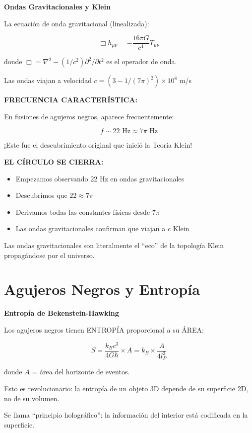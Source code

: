 \begin{nivelmatematico}
\textbf{Ondas Gravitacionales y Klein}

La ecuación de onda gravitacional (linealizada):

\begin{equation}
\Box h_{\mu\nu} = -\frac{16\pi G}{c^4} T_{\mu\nu}
\end{equation}

donde $\Box = \nabla^2 - (1/c^2)\partial^2/\partial t^2$ es el operador de onda.

Las ondas viajan a velocidad $c = (3 - 1/(7\pi)^2) \times 10^8$ m/s

\textbf{FRECUENCIA CARACTERÍSTICA:}

En fusiones de agujeros negros, aparece frecuentemente:

\begin{equation}
f \sim 22 \text{ Hz} \approx 7\pi \text{ Hz}
\end{equation}

¡Este fue el descubrimiento original que inició la Teoría Klein!
\end{nivelmatematico}

\textbf{EL CÍRCULO SE CIERRA:}

\begin{itemize}
    \item Empezamos observando 22 Hz en ondas gravitacionales
    \item Descubrimos que $22 \approx 7\pi$
    \item Derivamos todas las constantes físicas desde $7\pi$
    \item Las ondas gravitacionales confirman que viajan a $c$ Klein
\end{itemize}

Las ondas gravitacionales son literalmente el ``eco'' de la topología Klein
propagándose por el universo.


\section{Agujeros Negros y Entropía}

\begin{nivelconceptual}
\textbf{Entropía de Bekenstein-Hawking}

Los agujeros negros tienen ENTROPÍA proporcional a su ÁREA:

\begin{equation}
S = \frac{k_B c^3}{4G\hbar} \times A = k_B \times \frac{A}{4 l_P^2}
\end{equation}

donde $A$ = área del horizonte de eventos.

Esto es revolucionario: la entropía de un objeto 3D
depende de su superficie 2D, no de su volumen.

Se llama ``principio holográfico'': la información del interior
está codificada en la superficie.
\end{nivelconceptual}

